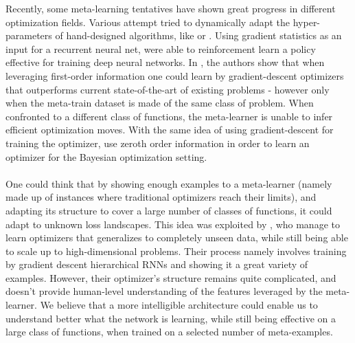 {{	Recently, some meta-learning tentatives have shown great progress in different optimization fields. Various attempt tried to dynamically adapt the hyper-parameters of hand-designed algorithms, like \cite{daniel2016learning} or \cite{hansen2016using}. Using gradient statistics as an input for a recurrent neural net, \cite{li2017learning} were able to reinforcement learn a policy effective for training deep neural networks. In \cite{andrychowicz2016learning}, the authors show that when leveraging first-order information one could learn by gradient-descent optimizers that outperforms current state-of-the-art of existing problems - however only when the meta-train dataset is made of the same class of problem. When confronted to a different class of functions, the meta-learner is unable to infer efficient optimization moves. With the same idea of using gradient-descent for training the optimizer, \cite{chen2017learning} use zeroth order information in order to learn an optimizer for the Bayesian optimization setting.  

	\paragraph{} One could think that by showing enough examples to a meta-learner (namely made up of instances where traditional optimizers reach their limits), and adapting its structure to cover a large number of classes of functions, it could adapt to unknown loss landscapes. This idea was exploited by \cite{wil2l}, who manage to learn optimizers that generalizes to completely unseen data, while still being able to scale up to high-dimensional problems. Their process namely involves training by gradient descent hierarchical RNNs and showing it a great variety of examples. However, their optimizer's structure remains quite complicated, and doesn't provide human-level understanding of the features leveraged by the meta-learner. We believe that a more intelligible architecture could enable us to understand better what the network is learning, while still being effective on a large class of functions, when trained on a selected number of meta-examples. 
	
}}
